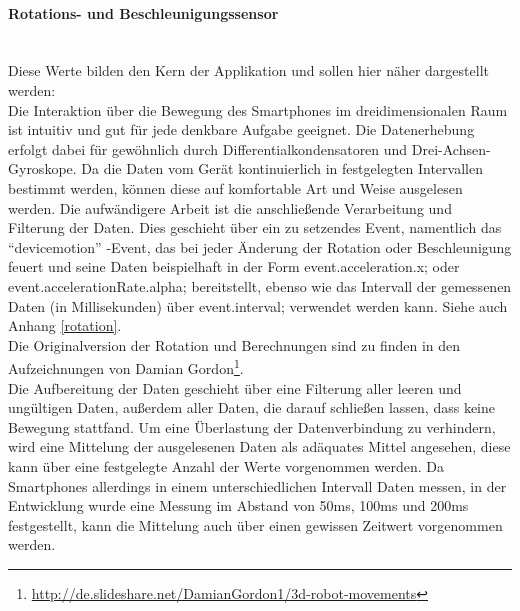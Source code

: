\documentclass[a4paper]{spie}  %
\begin{document}
		\paragraph{Rotations- und Beschleunigungssensor}\mbox{}\\
Diese Werte bilden den Kern der Applikation und sollen hier näher dargestellt werden:\\
Die Interaktion über die Bewegung des Smartphones im dreidimensionalen Raum ist intuitiv und gut für jede denkbare Aufgabe geeignet. Die Datenerhebung erfolgt dabei für gewöhnlich durch Differentialkondensatoren und Drei-Achsen-Gyroskope.
Da die Daten vom Gerät kontinuierlich in festgelegten Intervallen bestimmt werden, können diese auf komfortable Art und Weise ausgelesen werden. Die aufwändigere Arbeit ist die anschließende Verarbeitung und Filterung der Daten. Dies geschieht über ein zu setzendes Event, namentlich das \enquote{devicemotion} -Event, das bei jeder Änderung der Rotation oder Beschleunigung feuert und seine Daten beispielhaft in der Form event.acceleration.x; oder event.accelerationRate.alpha; bereitstellt, ebenso wie das Intervall der gemessenen Daten (in Millisekunden) über event.interval; verwendet werden kann. Siehe auch Anhang \ref{rotation}.\\
Die Originalversion der Rotation und Berechnungen sind zu finden in den Aufzeichnungen von Damian Gordon\footnote{\url{http://de.slideshare.net/DamianGordon1/3d-robot-movements}}.\\
Die Aufbereitung der Daten geschieht über eine Filterung aller leeren und ungültigen Daten, außerdem aller Daten, die darauf schließen lassen, dass keine Bewegung stattfand. Um eine Überlastung der Datenverbindung zu verhindern, wird eine Mittelung der ausgelesenen Daten als adäquates Mittel angesehen, diese kann über eine festgelegte Anzahl der Werte vorgenommen werden. Da Smartphones allerdings in einem unterschiedlichen Intervall Daten messen, in der Entwicklung wurde eine Messung im Abstand von 50ms, 100ms und 200ms festgestellt, kann die Mittelung auch über einen gewissen Zeitwert vorgenommen werden.
\end{document}
